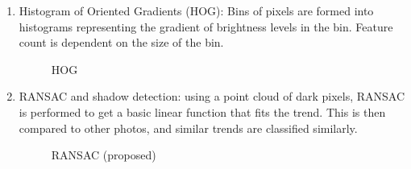 \documentclass{article}
\begin{document}
\begin{enumerate}[1.]
\item Histogram of Oriented Gradients (HOG): Bins of pixels are formed into histograms representing the gradient of brightness levels in the bin. Feature count is dependent on the size of the bin. 
\begin{figure}[H]
\centering
\setlength\fboxsep{2pt}
\setlength\fboxrule{0pt}
\caption{
HOG
}
\end{figure}

\item RANSAC and shadow detection: using a point cloud of dark pixels, RANSAC is performed to get a basic linear function that fits the trend. This is then compared to other photos, and similar trends are classified similarly.
\begin{figure}[H]
\centering
\setlength\fboxsep{2pt}
\setlength\fboxrule{0pt}
\caption{
RANSAC (proposed)
}
\end{figure}

\end{enumerate}
\end{document}
